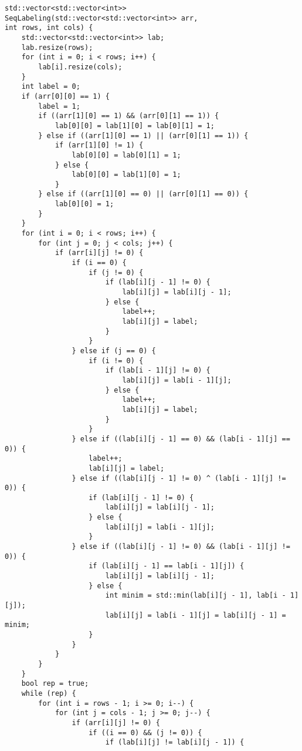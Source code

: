 \documentclass{report}
\begin{document}
\begin{lstlisting}
std::vector<std::vector<int>> SeqLabeling(std::vector<std::vector<int>> arr,
int rows, int cols) {
    std::vector<std::vector<int>> lab;
    lab.resize(rows);
    for (int i = 0; i < rows; i++) {
        lab[i].resize(cols);
    }
    int label = 0;
    if (arr[0][0] == 1) {
        label = 1;
        if ((arr[1][0] == 1) && (arr[0][1] == 1)) {
            lab[0][0] = lab[1][0] = lab[0][1] = 1;
        } else if ((arr[1][0] == 1) || (arr[0][1] == 1)) {
            if (arr[1][0] != 1) {
                lab[0][0] = lab[0][1] = 1;
            } else {
                lab[0][0] = lab[1][0] = 1;
            }
        } else if ((arr[1][0] == 0) || (arr[0][1] == 0)) {
            lab[0][0] = 1;
        }
    }
    for (int i = 0; i < rows; i++) {
        for (int j = 0; j < cols; j++) {
            if (arr[i][j] != 0) {
                if (i == 0) {
                    if (j != 0) {
                        if (lab[i][j - 1] != 0) {
                            lab[i][j] = lab[i][j - 1];
                        } else {
                            label++;
                            lab[i][j] = label;
                        }
                    }
                } else if (j == 0) {
                    if (i != 0) {
                        if (lab[i - 1][j] != 0) {
                            lab[i][j] = lab[i - 1][j];
                        } else {
                            label++;
                            lab[i][j] = label;
                        }
                    }
                } else if ((lab[i][j - 1] == 0) && (lab[i - 1][j] == 0)) {
                    label++;
                    lab[i][j] = label;
                } else if ((lab[i][j - 1] != 0) ^ (lab[i - 1][j] != 0)) {
                    if (lab[i][j - 1] != 0) {
                        lab[i][j] = lab[i][j - 1];
                    } else {
                        lab[i][j] = lab[i - 1][j];
                    }
                } else if ((lab[i][j - 1] != 0) && (lab[i - 1][j] != 0)) {
                    if (lab[i][j - 1] == lab[i - 1][j]) {
                        lab[i][j] = lab[i][j - 1];
                    } else {
                        int minim = std::min(lab[i][j - 1], lab[i - 1][j]);
                        lab[i][j] = lab[i - 1][j] = lab[i][j - 1] = minim;
                    }
                }
            }
        }
    }
    bool rep = true;
    while (rep) {
        for (int i = rows - 1; i >= 0; i--) {
            for (int j = cols - 1; j >= 0; j--) {
                if (arr[i][j] != 0) {
                    if ((i == 0) && (j != 0)) {
                        if (lab[i][j] != lab[i][j - 1]) {

\end{lstlisting}
\end{document}
